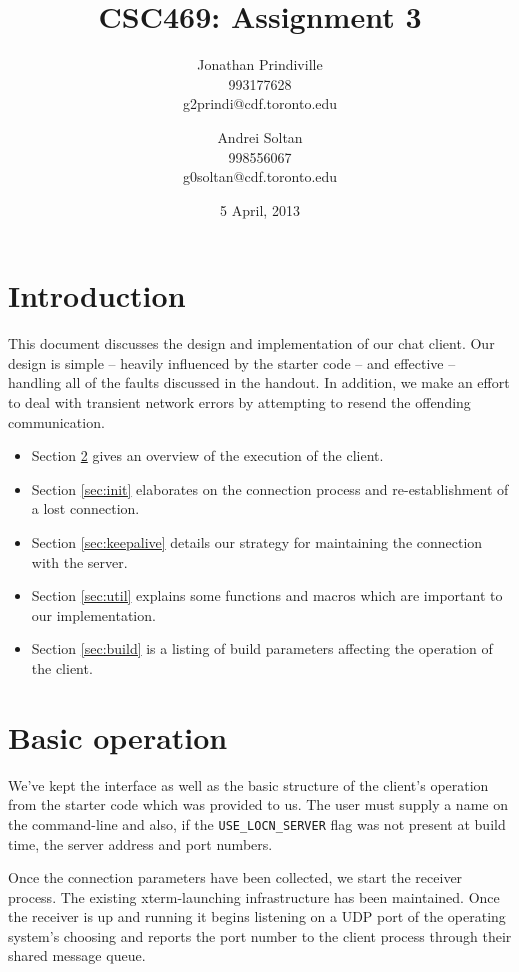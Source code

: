 \documentclass[12pt]{article}
\author {Jonathan Prindiville\\993177628\\g2prindi@cdf.toronto.edu
\and Andrei Soltan\\998556067\\g0soltan@cdf.toronto.edu}
\title{CSC469: Assignment 3}
\date{5 April, 2013}
\newcommand{\mono}[1]{\texttt{#1}}
\begin{document}
\maketitle

\tableofcontents

\newpage
\section{Introduction}
This document discusses the design and implementation of our
chat client. Our design is simple -- heavily influenced by the
starter code -- and effective -- handling all of the faults discussed
in the handout. In addition, we make an effort to deal with transient
network errors by attempting to resend the offending communication.

\begin{itemize}
\item Section \ref{sec:basic} gives an overview of the execution of the client.
\item Section \ref{sec:init} elaborates on the connection process and
re-establishment of a lost connection.
\item Section \ref{sec:keepalive} details our strategy for maintaining
the connection with the server.
\item Section \ref{sec:util} explains some functions and macros which
are important to our implementation.
\item Section \ref{sec:build} is a listing of build parameters affecting
the operation of the client.
\end{itemize}

\section{Basic operation}
\label{sec:basic}
We've kept the interface as well as the basic structure
 of the client's operation from the starter code which was
provided to us. The user must supply a name on the command-line and 
also, if the \mono{USE\_LOCN\_SERVER}
flag was not present at build time, the server address and port numbers.

Once the connection parameters have been collected, we start the
receiver process. The existing xterm-launching infrastructure has been
maintained. Once the receiver is up and running it begins listening
on a UDP port of the operating system's choosing and reports the port
number to the client process through their shared message queue.
\end{document}
